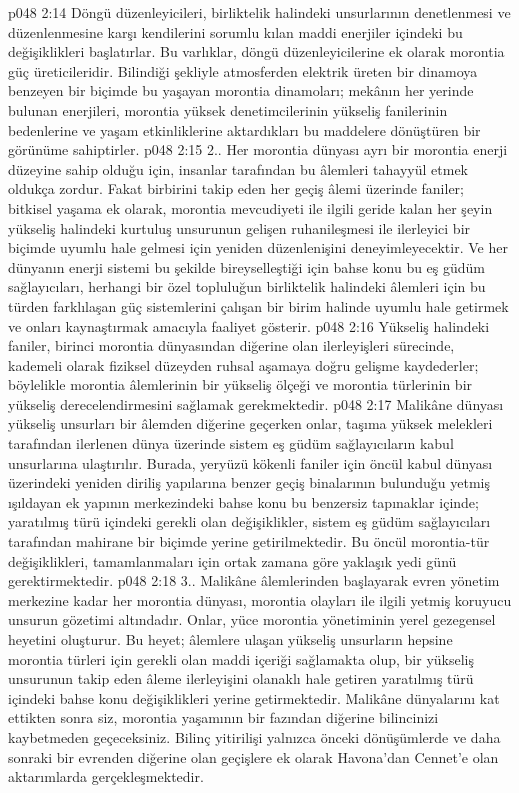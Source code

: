 \vs p048 2:14 Döngü düzenleyicileri, birliktelik halindeki unsurlarının denetlenmesi ve düzenlenmesine karşı kendilerini sorumlu kılan maddi enerjiler içindeki bu değişiklikleri başlatırlar. Bu varlıklar, döngü düzenleyicilerine ek olarak morontia güç üreticileridir. Bilindiği şekliyle atmosferden elektrik üreten bir dinamoya benzeyen bir biçimde bu yaşayan morontia dinamoları; mekânın her yerinde bulunan enerjileri, morontia yüksek denetimcilerinin yükseliş fanilerinin bedenlerine ve yaşam etkinliklerine aktardıkları bu maddelere dönüştüren bir görünüme sahiptirler.
\vs p048 2:15 2.\bibnobreakspace {}. Her morontia dünyası ayrı bir morontia enerji düzeyine sahip olduğu için, insanlar tarafından bu âlemleri tahayyül etmek oldukça zordur. Fakat birbirini takip eden her geçiş âlemi üzerinde faniler; bitkisel yaşama ek olarak, morontia mevcudiyeti ile ilgili geride kalan her şeyin yükseliş halindeki kurtuluş unsurunun gelişen ruhanileşmesi ile ilerleyici bir biçimde uyumlu hale gelmesi için yeniden düzenlenişini deneyimleyecektir. Ve her dünyanın enerji sistemi bu şekilde bireyselleştiği için bahse konu bu eş güdüm sağlayıcıları, herhangi bir özel topluluğun birliktelik halindeki âlemleri için bu türden farklılaşan güç sistemlerini çalışan bir birim halinde uyumlu hale getirmek ve onları kaynaştırmak amacıyla faaliyet gösterir.
\vs p048 2:16 Yükseliş halindeki faniler, birinci morontia dünyasından diğerine olan ilerleyişleri sürecinde, kademeli olarak fiziksel düzeyden ruhsal aşamaya doğru gelişme kaydederler; böylelikle morontia âlemlerinin bir yükseliş ölçeği ve morontia türlerinin bir yükseliş derecelendirmesini sağlamak gerekmektedir.
\vs p048 2:17 Malikâne dünyası yükseliş unsurları bir âlemden diğerine geçerken onlar, taşıma yüksek melekleri tarafından ilerlenen dünya üzerinde sistem eş güdüm sağlayıcıların kabul unsurlarına ulaştırılır. Burada, yeryüzü kökenli faniler için öncül kabul dünyası üzerindeki yeniden diriliş yapılarına benzer geçiş binalarının bulunduğu yetmiş ışıldayan ek yapının merkezindeki bahse konu bu benzersiz tapınaklar içinde; yaratılmış türü içindeki gerekli olan değişiklikler, sistem eş güdüm sağlayıcıları tarafından mahirane bir biçimde yerine getirilmektedir. Bu öncül morontia\hyp{}tür değişiklikleri, tamamlanmaları için ortak zamana göre yaklaşık yedi günü gerektirmektedir.
\vs p048 2:18 3.\bibnobreakspace {}. Malikâne âlemlerinden başlayarak evren yönetim merkezine kadar her morontia dünyası, morontia olayları ile ilgili yetmiş koruyucu unsurun gözetimi altındadır. Onlar, yüce morontia yönetiminin yerel gezegensel heyetini oluşturur. Bu heyet; âlemlere ulaşan yükseliş unsurların hepsine morontia türleri için gerekli olan maddi içeriği sağlamakta olup, bir yükseliş unsurunun takip eden âleme ilerleyişini olanaklı hale getiren yaratılmış türü içindeki bahse konu değişiklikleri yerine getirmektedir. Malikâne dünyalarını kat ettikten sonra siz, morontia yaşamının bir fazından diğerine bilincinizi kaybetmeden geçeceksiniz. Bilinç yitirilişi yalnızca önceki dönüşümlerde ve daha sonraki bir evrenden diğerine olan geçişlere ek olarak Havona’dan Cennet’e olan aktarımlarda gerçekleşmektedir.
